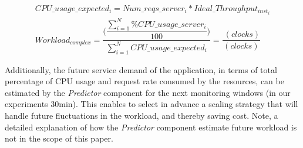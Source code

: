 \vspace{-5mm}
{\scriptsize
\begin{equation}\label{workload_complexity}
\begin{split}
CPU\_usage\_expected_{i} =  Num\_reqs\_server_{i}  * Ideal\_Throughput_{inst_{i}} \\
Workload_{complex}  = \dfrac{ \bigg(  \dfrac{ \sum_{i=1}^N \%CPU\_usage\_server_{i} } {100} \bigg) }  {  \sum_{i=1}^N  CPU\_usage\_expected_{i}     } = \dfrac{ \ (clocks) }  {  (clocks) }
\end{split}
\end{equation}
}

Additionally, the future service demand of the application, in terms of total percentage of CPU usage and request rate consumed by the resources, can be estimated by the \emph{Predictor} component for the next monitoring windows (in our experiments 30min). This enables to select in advance a scaling strategy that will handle future fluctuations in the workload, and thereby saving cost. Note, a detailed explanation of how the \emph{Predictor} component estimate future workload is not in the scope of this paper.




